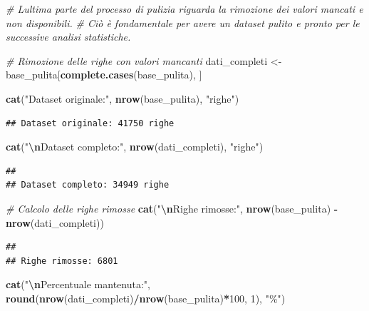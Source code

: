 \documentclass[
]{article}
\newenvironment{Shaded}{\begin{snugshade}}{\end{snugshade}}
\newcommand{\CommentTok}[1]{\textcolor[rgb]{0.56,0.35,0.01}{\textit{#1}}}
\newcommand{\DecValTok}[1]{\textcolor[rgb]{0.00,0.00,0.81}{#1}}
\newcommand{\FunctionTok}[1]{\textcolor[rgb]{0.13,0.29,0.53}{\textbf{#1}}}
\newcommand{\NormalTok}[1]{#1}
\newcommand{\OtherTok}[1]{\textcolor[rgb]{0.56,0.35,0.01}{#1}}
\newcommand{\SpecialCharTok}[1]{\textcolor[rgb]{0.81,0.36,0.00}{\textbf{#1}}}
\newcommand{\StringTok}[1]{\textcolor[rgb]{0.31,0.60,0.02}{#1}}
\begin{document}
\begin{Shaded}
\begin{Highlighting}[]
\CommentTok{\# L\textquotesingle{}ultima parte del processo di pulizia riguarda la rimozione dei valori mancati e non disponibili. }
\CommentTok{\# Ciò è fondamentale per avere un dataset pulito e pronto per le successive analisi statistiche.}

\CommentTok{\# Rimozione delle righe con valori mancanti}
\NormalTok{dati\_completi }\OtherTok{\textless{}{-}}\NormalTok{ base\_pulita[}\FunctionTok{complete.cases}\NormalTok{(base\_pulita), ]}

\FunctionTok{cat}\NormalTok{(}\StringTok{"Dataset originale:"}\NormalTok{, }\FunctionTok{nrow}\NormalTok{(base\_pulita), }\StringTok{"righe"}\NormalTok{)}
\end{Highlighting}
\end{Shaded}

\begin{verbatim}
## Dataset originale: 41750 righe
\end{verbatim}

\begin{Shaded}
\begin{Highlighting}[]
\FunctionTok{cat}\NormalTok{(}\StringTok{"}\SpecialCharTok{\textbackslash{}n}\StringTok{Dataset completo:"}\NormalTok{, }\FunctionTok{nrow}\NormalTok{(dati\_completi), }\StringTok{"righe"}\NormalTok{)}
\end{Highlighting}
\end{Shaded}

\begin{verbatim}
## 
## Dataset completo: 34949 righe
\end{verbatim}

\begin{Shaded}
\begin{Highlighting}[]
\CommentTok{\# Calcolo delle righe rimosse}
\FunctionTok{cat}\NormalTok{(}\StringTok{"}\SpecialCharTok{\textbackslash{}n}\StringTok{Righe rimosse:"}\NormalTok{, }\FunctionTok{nrow}\NormalTok{(base\_pulita) }\SpecialCharTok{{-}} \FunctionTok{nrow}\NormalTok{(dati\_completi))}
\end{Highlighting}
\end{Shaded}

\begin{verbatim}
## 
## Righe rimosse: 6801
\end{verbatim}

\begin{Shaded}
\begin{Highlighting}[]
\FunctionTok{cat}\NormalTok{(}\StringTok{"}\SpecialCharTok{\textbackslash{}n}\StringTok{Percentuale mantenuta:"}\NormalTok{, }\FunctionTok{round}\NormalTok{(}\FunctionTok{nrow}\NormalTok{(dati\_completi)}\SpecialCharTok{/}\FunctionTok{nrow}\NormalTok{(base\_pulita)}\SpecialCharTok{*}\DecValTok{100}\NormalTok{, }\DecValTok{1}\NormalTok{), }\StringTok{"\%"}\NormalTok{)}
\end{Highlighting}
\end{Shaded}
\end{document}
